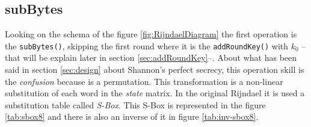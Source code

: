 \documentclass[10pt,a4paper,twoside]{llncs}
\begin{document}
\subsection{subBytes}\label{sec:subBytes}

Looking on the schema of the figure \ref{fig:RijndaelDiagram} the first operation is the {\tt subBytes()}, skipping the first round where it is the {\tt addRoundKey()} with $k_0$ --that will be explain later in section \ref{sec:addRoundKey}--. About what has been said in section \ref{sec:design} about Shannon's perfect secrecy, this operation skill is the \emph{confusion} because is a permutation. This transformation is a non-linear substitution of each word in the \emph{state} matrix. In the original Rijndael it is used a substitution table called \emph{S-Box}. This S-Box is represented in the figure \ref{tab:sbox8} and there is also an inverse of it in figure \ref{tab:inv-sbox8}.
\end{document}
